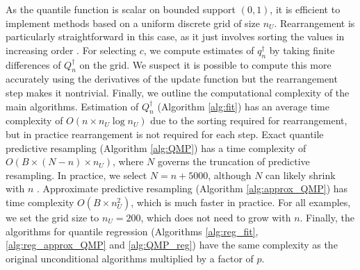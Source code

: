 \documentclass[11pt,a4paper]{article}
\begin{document}
\begin{appendices}
As the quantile function is scalar on bounded support $(0,1)$, it is efficient to implement methods based on a uniform discrete grid of size $n_U$. Rearrangement is particularly straightforward in this case, as it just involves sorting the values in increasing order \citep{Chernozhukov2009}. For selecting $c$, we compute estimates of $q_n^{\dagger}$ by taking finite differences of $Q_n^{\dagger}$ on the grid. We suspect it is possible to compute this more accurately using the derivatives of the update function but the rearrangement step makes it nontrivial. Finally, we outline the computational complexity of the main algorithms. Estimation of $Q_n^{\dagger}$ ({Algorithm \ref{alg:fit}}) has an average time complexity of  $O(n \times n_U\log n_U )$ due to the sorting required for rearrangement, but in practice rearrangement is not required for each step.
Exact quantile predictive resampling ({Algorithm \ref{alg:QMP}}) has a time complexity of $O(B\times (N-n) \times n_U)$, where $N$ governs the truncation of predictive resampling. In practice, we select $N = n + 5000$, although $N$ can likely shrink with $n$ \citep{Fong2023a}. Approximate predictive resampling ({Algorithm \ref{alg:approx_QMP}}) has time complexity $O(B \times n_U^2)$, which is much faster in practice.
For all examples, we set the grid size to $n_U = 200$, which does not need to grow with $n$. Finally, the algorithms for quantile regression ({Algorithms \ref{alg:reg_fit}}, {\ref{alg:reg_approx_QMP}} and {\ref{alg:QMP_reg}})  have the same complexity as the original unconditional algorithms
multiplied by a factor of $p$.


\end{appendices}
\end{document}
